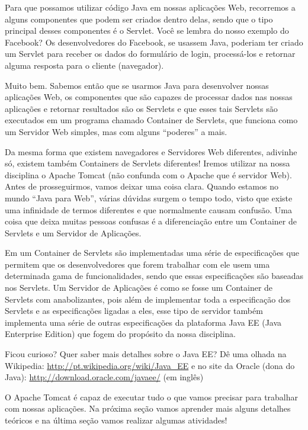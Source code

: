 Para que possamos utilizar código Java em nossas aplicações Web, recorremos a alguns componentes que podem ser criados dentro delas, sendo que o tipo principal desses componentes é o Servlet. Você se lembra do nosso exemplo do Facebook? Os desenvolvedores do Facebook, se usassem Java, poderiam ter criado um Servlet para receber os dados do formulário de login, processá-los e retornar alguma resposta para o cliente (navegador).

Muito bem. Sabemos então que se usarmos Java para desenvolver nossas aplicações Web, os componentes que são capazes de processar dados nas nossas aplicações e retornar resultados são os Servlets e que esses tais Servlets são executados em um programa chamado Container de Servlets, que funciona como um Servidor Web simples, mas com alguns ``poderes'' a mais.

Da mesma forma que existem navegadores e Servidores Web diferentes, adivinhe só, existem também Containers de Servlets diferentes! Iremos utilizar na nossa disciplina o Apache Tomcat (não confunda com o Apache que é servidor Web). Antes de prosseguirmos, vamos deixar uma coisa clara. Quando estamos no mundo ``Java para Web'', várias dúvidas surgem o tempo todo, visto que existe uma infinidade de termos diferentes e que normalmente causam confusão. Uma coisa que deixa muitas pessoas confusas é a diferenciação entre um Container de Servlets e um Servidor de Aplicações.

Em um Container de Servlets são implementadas uma série de especificações que permitem que os desenvolvedores que forem trabalhar com ele usem uma determinada gama de funcionalidades, sendo que essas especificações são baseadas nos Servlets. Um Servidor de Aplicações é como se fosse um Container de Servlets com anabolizantes, pois além de implementar toda a especificação dos Servlets e as especificações ligadas a eles, esse tipo de servidor também implementa uma série de outras especificações da plataforma Java EE (Java Enterprise Edition) que fogem do propósito da nossa disciplina.

\begin{saibaMais}
    Ficou curioso? Quer saber mais detalhes sobre o Java EE? Dê uma olhada na Wikipedia: \url{http://pt.wikipedia.org/wiki/Java_EE} e no site da Oracle (dona do Java): \url{http://download.oracle.com/javaee/} (em inglês)
\end{saibaMais}

O Apache Tomcat é capaz de executar tudo o que vamos precisar para trabalhar com nossas aplicações. Na próxima seção vamos aprender mais alguns detalhes teóricos e na última seção vamos realizar algumas atividades!


